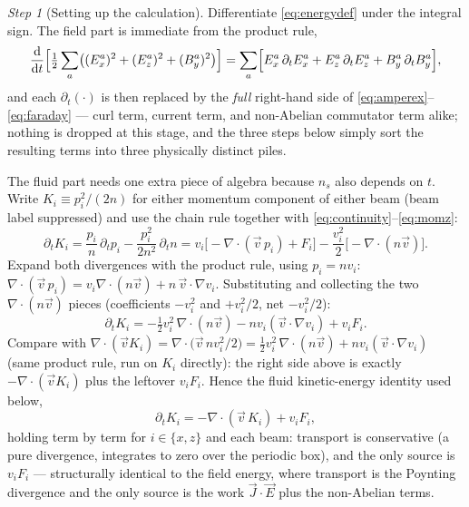 \documentclass[11pt,a4paper]{article}
\numberwithin{equation}{section}
\theoremstyle{remark}
\newtheorem{step}{Step}[subsection]
\newcommand{\dd}{\mathrm{d}}
\begin{document}
\begin{step}[Setting up the calculation]
Differentiate \eqref{eq:energydef} under the integral sign. The field part
is immediate from the product rule,
\begin{equation}
\frac{\dd}{\dd t}\Bigl[\tfrac12\sum_a\bigl((E_x^a)^2+(E_z^a)^2+(B_y^a)^2\bigr)\Bigr]
=\sum_a\Bigl[E_x^a\,\partial_tE_x^a+E_z^a\,\partial_tE_z^a+B_y^a\,\partial_tB_y^a\Bigr],
\end{equation}
and each $\partial_t(\cdot)$ is then replaced by the \emph{full}
right-hand side of \eqref{eq:amperex}--\eqref{eq:faraday} --- curl term,
current term, and non-Abelian commutator term alike; nothing is dropped at
this stage, and the three steps below simply sort the resulting terms into
three physically distinct piles.

The fluid part needs one extra piece of algebra because $n_s$ also depends
on $t$. Write $K_i\equiv p_i^2/(2n)$ for either momentum component of
either beam (beam label suppressed) and use the chain rule together with
\eqref{eq:continuity}--\eqref{eq:momz}:
\begin{equation}
\partial_tK_i=\frac{p_i}{n}\,\partial_tp_i-\frac{p_i^2}{2n^2}\,\partial_tn
=v_i\bigl[-\nabla\!\cdot\!(\vec v\,p_i)+F_i\bigr]
-\frac{v_i^2}{2}\bigl[-\nabla\!\cdot\!(n\vec v)\bigr].
\end{equation}
Expand both divergences with the product rule, using $p_i=nv_i$:
$\nabla\!\cdot\!(\vec v\,p_i)=v_i\nabla\!\cdot\!(n\vec v)
+n\,\vec v\!\cdot\!\nabla v_i$. Substituting and collecting the two
$\nabla\!\cdot\!(n\vec v)$ pieces (coefficients $-v_i^2$ and $+v_i^2/2$,
net $-v_i^2/2$):
\begin{equation}
\partial_tK_i=-\tfrac12v_i^2\,\nabla\!\cdot\!(n\vec v)
-n v_i(\vec v\!\cdot\!\nabla v_i)+v_iF_i .
\end{equation}
Compare with $\nabla\!\cdot\!(\vec vK_i)=\nabla\!\cdot\!\bigl(\vec v\,
nv_i^2/2\bigr)=\tfrac12v_i^2\,\nabla\!\cdot\!(n\vec v)
+nv_i(\vec v\!\cdot\!\nabla v_i)$ (same product rule, run on $K_i$
directly): the right side above is exactly $-\nabla\!\cdot\!(\vec vK_i)$
plus the leftover $v_iF_i$. Hence the fluid kinetic-energy identity used
below,
\begin{equation}
\partial_tK_i=-\nabla\!\cdot\!(\vec v\,K_i)+v_iF_i ,
\label{eq:kinlemma}
\end{equation}
holding term by term for $i\in\{x,z\}$ and each beam: transport is
conservative (a pure divergence, integrates to zero over the periodic box),
and the only source is $v_iF_i$ --- structurally identical to the field
energy, where transport is the Poynting divergence and the only source is
the work $\vec J\cdot\vec E$ plus the non-Abelian terms.
\end{step}
\end{document}
